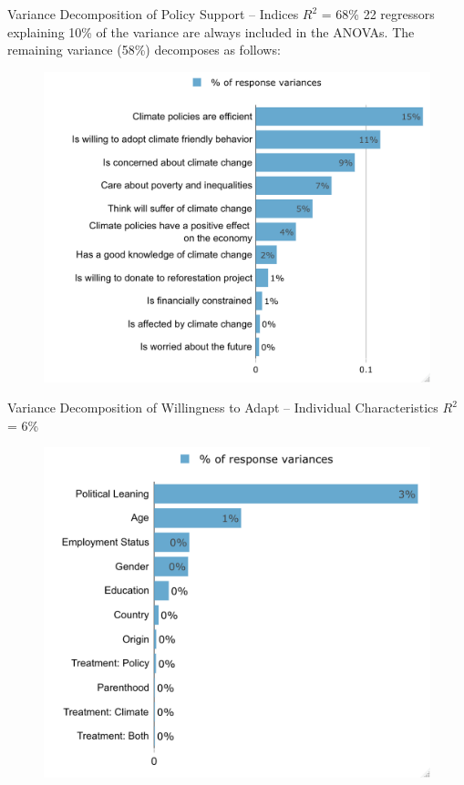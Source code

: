 \begin{frame}{Variance Decomposition of Policy Support -- Indices}%
\vspace{-.1cm}
{\footnotesize $R^2$ = 68\% 22 regressors explaining 10\% of the variance are always included in the ANOVAs. The remaining variance (58\%) decomposes as follows:}
\begin{figure}[h!]
\vspace{-.2cm}
\includegraphics[width=.9\textwidth]{../../figures/Gelbach/lmg_all_policies_non_standardized} \\
\end{figure}
\end{frame}


\begin{frame}{Variance Decomposition of Willingness to Adapt -- Individual Characteristics}%
\vspace{-.1cm}
{\footnotesize $R^2$ = 6\%}
\begin{figure}[h!]
\vspace{-.1cm}
\includegraphics[width=.64\textwidth]{../../figures/Gelbach/lmg_willing_change_no_indices_non_standardized} \\
\end{figure}
\end{frame}

